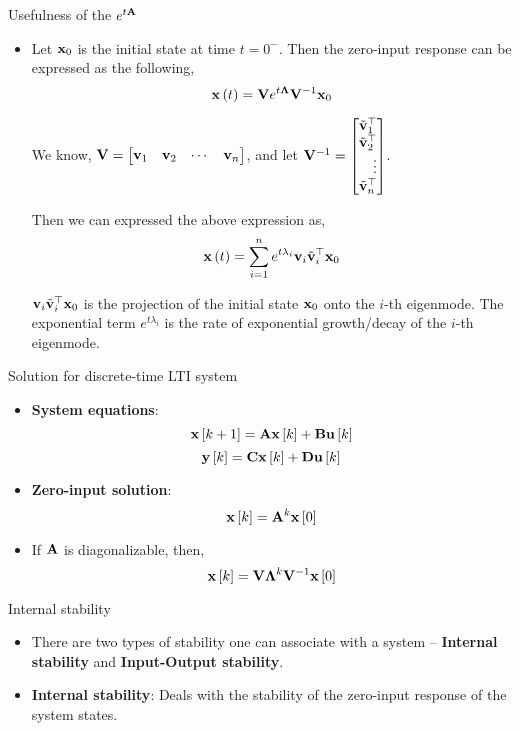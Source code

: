 \documentclass[aspectratio=169]{beamer}
\let\olditem\item
\renewcommand{\item}{\setlength{\itemsep}{\fill}\olditem}
\def\mf{\ensuremath\mathbf}
\def\lp{\ensuremath\left(}
\def\rp{\ensuremath\right)}
\def\ls{\ensuremath\left[}
\def\rs{\ensuremath\right]}
\def\bmx{\ensuremath\begin{bmatrix*}[r]}
\def\emx{\ensuremath\end{bmatrix*}}
\newcommand{\ct}[1]{\lp #1\rp}
\newcommand{\dt}[1]{\ls #1\rs}
\begin{document}
\begin{frame}[t]{Usefulness of the $e^{t\mf{A}}$}
\begin{itemize}
    \item Let $\mf{x}_0$ is the initial state at time $t = 0^-$. Then the zero-input response can be expressed as the following,
    \[ \mf{x}\ct{t} = \mf{V}e^{t\mf{\Lambda}}\mf{V}^{-1}\mf{x}_0 \]
    
    We know, $\mf{V} = \bmx \mf{v}_1 & \mf{v}_2 & \cdots & \mf{v}_n\emx$, and let $\mf{V}^{-1} = \bmx \tilde{\mf{v}}_1^\top \\ \tilde{\mf{v}}_2^\top \\ \vdots \\ \tilde{\mf{v}}_n^\top \emx$.
    
    Then we can expressed the above expression as,
    \[ \mf{x}\ct{t} = \sum_{i=1}^n e^{t \lambda_i} \mf{v}_i\tilde{\mf{v}}_i^\top \mf{x}_0 \]

    $\mf{v}_i\tilde{\mf{v}}_i^\top \mf{x}_0$ is the projection of the initial state $\mf{x}_0$ onto the $i$-th eigenmode. The exponential term $e^{t \lambda_i}$ is the rate of exponential growth/decay of the $i$-th eigenmode.
\end{itemize}
\end{frame}


\begin{frame}[t]{Solution for discrete-time LTI system}
\begin{itemize}
    \item \textbf{System equations}:
    \[ \mf{x}\dt{k+1} = \mf{A}\mf{x}\dt{k} + \mf{B}\mf{u}\dt{k} \]
    \[ \mf{y}\dt{k} = \mf{C}\mf{x}\dt{k} + \mf{D}\mf{u}\dt{k} \]

    \item \textbf{Zero-input solution}:
    $$\mf{x}\dt{k} = \mf{A}^k\mf{x}\dt{0}$$
    
    \item If $\mf{A}$ is diagonalizable, then,
    $$\mf{x}\dt{k} = \mf{V}\mf{\Lambda}^k\mf{V}^{-1}\mf{x}\dt{0}$$
\end{itemize}
\end{frame}

\begin{frame}[t]{Internal stability}
\begin{itemize}
    \item There are two types of stability one can associate with a system  -- \textbf{Internal stability} and \textbf{Input-Output stability}.

    \item \textbf{Internal stability}: Deals with the stability of the zero-input response of the system states.
\end{itemize}
\end{frame}
\end{document}
